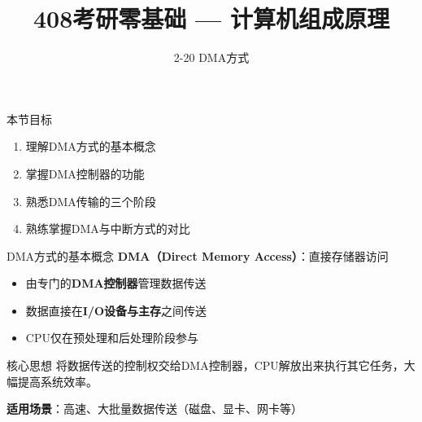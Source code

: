 \documentclass[10pt, aspectratio=169]{beamer}
\title{408考研零基础 --- 计算机组成原理}
\subtitle{2-20 DMA方式}
\author{}
\date{}
\begin{document}
\begin{frame}{本节目标}
    \begin{enumerate}
        \item 理解DMA方式的基本概念
        \item 掌握DMA控制器的功能
        \item 熟悉DMA传输的三个阶段
        \item 熟练掌握DMA与中断方式的对比
    \end{enumerate}
\end{frame}

\begin{frame}{DMA方式的基本概念}
    \textbf{DMA（Direct Memory Access）}：直接存储器访问
    \vspace{0.3em}
    \begin{itemize}
        \item 由专门的\textbf{DMA控制器}管理数据传送
        \item 数据直接在\textbf{I/O设备与主存}之间传送
        \item CPU仅在预处理和后处理阶段参与
    \end{itemize}
    \vspace{0.5em}
    \begin{block}{核心思想}
        将数据传送的控制权交给DMA控制器，CPU解放出来执行其它任务，大幅提高系统效率。
    \end{block}
    \vspace{0.3em}
    \textbf{适用场景}：高速、大批量数据传送（磁盘、显卡、网卡等）
\end{frame}
\end{document}
